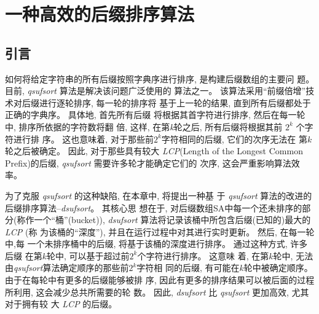 

\chapter{一种高效的后缀排序算法}
\section{引言}
\label{sec:3_introduction}

如何将给定字符串的所有后缀按照字典序进行排序, 是构建后缀数组的主要问
题。 目前, \emph{qsufsort}\cite{Larsson2007} 算法是解决该问题广泛使用的
算法之一。 该算法采用“前缀倍增”技术对后缀进行逐轮排序, 每一轮的排序将
基于上一轮的结果, 直到所有后缀都处于正确的字典序。 具体地, 首先所有后缀
将根据其首字符进行排序, 然后在每一轮中, 排序所依据的字符数将翻
倍, 这样, 在第\emph{k}轮之后, 所有后缀将根据其前 $2^{k}$ 个字符进行排
序。 这也意味着, 对于那些前$2^{k}$字符相同的后缀, 它们的次序无法在
第$k$轮之后被确定。 因此, 对于那些具有较大 \emph{LCP}(Length of the
Longest Common Prefix)的后缀, \emph{qsufsort} 需要许多轮才能确定它们的
次序, 这会严重影响算法效率。

为了克服 \emph{qsufsort} 的这种缺陷, 在本章中, 将提出一种基
于 \emph{qsufsort} 算法的改进的后缀排序算法--\emph{dsufsort}。 其核心思
想在于, 对后缀数组SA中每一个还未排序的部分(称作一个“桶”(bucket)),
\emph{dsufsort} 算法将记录该桶中所包含后缀(已知的)最大的\emph{LCP} (称
为该桶的“深度”), 并且在运行过程中对其进行实时更新。 然后, 在每一轮中,每
一个未排序桶中的后缀, 将基于该桶的深度进行排序。 通过这种方式, 许多后缀
在第$k$轮中, 可以基于超过前$2^k$个字符进行排序。 这意味
着, 在第$k$轮中, 无法由\emph{qsufsort}算法确定顺序的那些前$2^{k}$字符相
同的后缀, 有可能在$k$轮中被确定顺序。 由于在每轮中有更多的后缀能够被排
序, 因此有更多的排序结果可以被后面的过程所利用, 这会减少总共所需要的轮
数。 因此, \emph{dsufsort} 比 \emph{qsufsort} 更加高效, 尤其对于拥有较
大 \emph{LCP} 的后缀。

